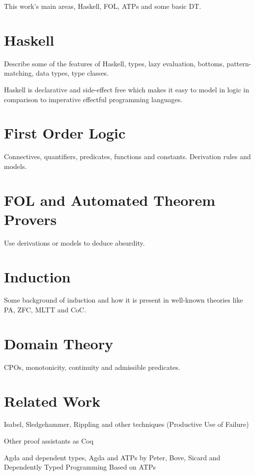\documentclass{report}
\begin{document}
This work's main areas, Haskell, FOL, ATPs and some basic DT.

\section{Haskell}

Describe some of the features of Haskell, types, lazy evaluation,
bottoms, pattern-matching, data types, type classes.

Haskell is declarative and side-effect free which makes it easy
to model in logic in comparison to imperative effectful programming languages.

\section{First Order Logic}

Connectives, quantifiers, predicates, functions and constants.
Derivation rules and models.

\section{FOL and Automated Theorem Provers}

Use derivations or models to deduce absurdity.

\section{Induction}

Some background of induction and how it is present in well-known
theories like PA, ZFC, MLTT and CoC.

\section{Domain Theory}

CPOs, monotonicity, continuity and admissible predicates.

\section{Related Work}

Isabel, Sledgehammer, Rippling and other techniques
(Productive Use of Failure)

Other proof assistants as Coq

Agda and dependent types, Agda and ATPs by Peter, Bove, Sicard
\cite{agdaatp} and Dependently Typed Programming Based on ATPs
\end{document}
